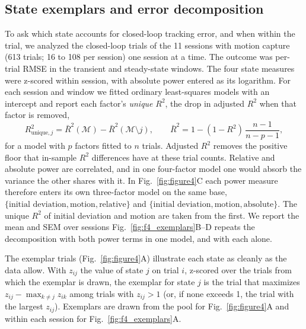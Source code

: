 \subsection*{State exemplars and error decomposition}

To ask which state accounts for closed-loop tracking error, and when within the trial, we analyzed the closed-loop trials of the 11 sessions with motion capture (613 trials; 16 to 108 per session) one session at a time.
The outcome was per-trial RMSE in the transient and steady-state windows.
The four state measures were z-scored within session, with absolute power entered as its logarithm.
For each session and window we fitted ordinary least-squares models with an intercept and report each factor's \emph{unique} $R^2$, the drop in adjusted $R^2$ when that factor is removed,
%
\begin{equation}
    R^{2}_{\mathrm{unique},j} = \bar{R}^{2}(\mathcal{M}) - \bar{R}^{2}(\mathcal{M} \setminus j),
    \qquad \bar{R}^{2} = 1 - (1 - R^{2})\,\frac{n - 1}{n - p - 1},
    \label{eq:uniqueR2}
\end{equation}
%
for a model with $p$ factors fitted to $n$ trials.
Adjusted $R^2$ removes the positive floor that in-sample $R^2$ differences have at these trial counts.
Relative and absolute power are correlated, and in one four-factor model one would absorb the variance the other shares with it.
In Fig.~\ref{fig:figure4}C each power measure therefore enters its own three-factor model on the same base, $\{\text{initial deviation}, \text{motion}, \text{relative}\}$ and $\{\text{initial deviation}, \text{motion}, \text{absolute}\}$.
The unique $R^2$ of initial deviation and motion are taken from the first.
We report the mean and SEM over sessions
Fig.~\ref{fig:f4_exemplars}B--D repeats the decomposition with both power terms in one model, and with each alone.

The exemplar trials (Fig.~\ref{fig:figure4}A) illustrate each state as cleanly as the data allow.
With $z_{ij}$ the value of state $j$ on trial $i$, z-scored over the trials from which the exemplar is drawn, the exemplar for state $j$ is the trial that maximizes $z_{ij} - \max_{k \neq j} z_{ik}$ among trials with $z_{ij} > 1$ (or, if none exceeds 1, the trial with the largest $z_{ij}$).
Exemplars are drawn from the pool for Fig.~\ref{fig:figure4}A and within each session for Fig.~\ref{fig:f4_exemplars}A.

